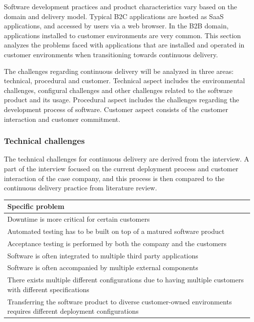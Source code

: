 \documentclass[english]{tktltiki2}
\theoremstyle{definition}
\theoremstyle{remark}
\begin{document}
Software development practices and product characteristics vary based on the domain and delivery model. Typical B2C applications are hosted as SaaS applications, and accessed by users via a web browser. In the B2B domain, applications installed to customer environments are very common. This section analyzes the problems faced with applications that are installed and operated in customer environments when transitioning towards continuous delivery.

The challenges regarding continuous delivery will be analyzed in three areas: technical, procedural and customer. Technical aspect includes the environmental challenges, configural challenges and other challenges related to the software product and its usage. Procedural aspect includes the challenges regarding the development process of software. Customer aspect consists of the customer interaction and customer commitment.

\subsubsection{Technical challenges}
The technical challenges for continuous delivery are derived from the interview. A part of the interview focused on the current deployment process and customer interaction of the case company, and this process is then compared to the continuous delivery practice from literature review.

\begin{center}
    \begin{tabular}{ | p{12cm} |}
    \hline
    \textbf{Specific problem} \\ \hline
    Downtime is more critical for certain customers \\ \hline
    Automated testing has to be built on top of a matured software product \\ \hline
    Acceptance testing is performed by both the company and the customers \\ \hline
    Software is often integrated to multiple third party applications \\ \hline
    Software is often accompanied by multiple external components \\ \hline
    There exists multiple different configurations due to having multiple customers with different specifications \\ \hline
    Transferring the software product to diverse customer-owned environments requires different deployment configurations \\ 
    \hline
    \end{tabular}
\end{center}
\end{document}
